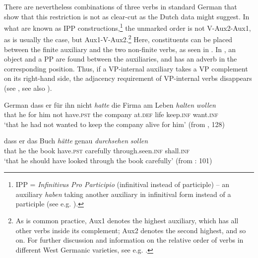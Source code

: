 \documentclass[output=paper, colorlinks, citecolor=brown]{langscibook}
\begin{document}
\z 
\z

There are nevertheless combinations of three verbs in standard German that show that this restriction is not as clear-cut as the Dutch data might suggest. In what are known as IPP constructions,\footnote{IPP = \textit{Infinitivus Pro Participio} (infinitival instead of participle) – an auxiliary \textit{haben} taking another auxiliary in infinitival form instead of a participle (see e.g. \citealt[46–48]{Wurmbrand2004}).} the unmarked order is not V-Aux2-Aux1, as is usually the case, but Aux1-V-Aux2.\footnote{As is common practice, Aux1 denotes the highest auxiliary, which has all other verbs inside its complement; Aux2 denotes the second highest, and so on. For further discussion and information on the relative order of verbs in different West Germanic varieties, see e.g. \citet{Wurmbrand2004,Sapp2011,Culicover2014}.} Here, constituents can be placed between the finite auxiliary and the two non-finite verbs, as seen in . In , an object and a PP are found between the auxiliaries, and  has an adverb in the corresponding position. Thus, if a VP-internal auxiliary takes a VP complement on its right-hand side, the adjacency requirement of VP-internal verbs disappears (see \citealt[97–102]{Sheehan2017Final}, see also \cites[]{Haider2003}[132–135]{Haider2013}).


\ea German
\label{ex:sangfelt:19}
\ea\label{ex:sangfelt:19a}
\gll dass er für ihn nicht \textit{hatte} {die} {Firma} am Leben \textit{halten} \textit{wollen} \\
 that he for him not have.\textsc{pst} the company at.\textsc{def} life keep.\textsc{inf} want.\textsc{inf} \\
\glt ‘that he had not wanted to keep the company alive for him’ (from \citealt{Haider2013}, 128)

\ex\label{ex:sangfelt:19b}
\gll dass er das Buch \textit{hätte} {genau} \textit{durchsehen} \textit{sollen}\\
 that he the book have.\textsc{pst} carefully through.seen.\textsc{inf} shall.\textsc{inf} \\
\glt ‘that he should have looked through the book carefully’ (from \citealt{Sheehan2017Final}: 101)
\z 
\z
\end{document}
